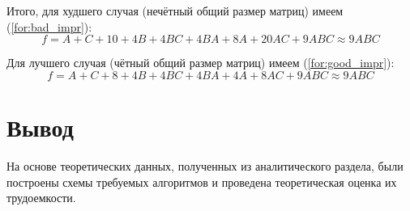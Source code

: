 Итого, для худшего случая (нечётный общий размер матриц) имеем (\ref{for:bad_impr}):
\begin{equation}
	\label{for:bad_impr}
	f = A + C + 10 + 4B + 4BC + 4BA + 8A + 20AC + 9ABC \approx 9ABC
\end{equation}

Для лучшего случая (чётный общий размер матриц) имеем (\ref{for:good_impr}):
\begin{equation}
	\label{for:good_impr}
	f = A + C + 8 + 4B +4BC + 4BA + 4A + 8AC + 9ABC \approx 9ABC
\end{equation}
\section{Вывод}

На основе теоретических данных, полученных из аналитического раздела, были построены схемы требуемых алгоритмов и проведена теоретическая оценка их трудоемкости.
